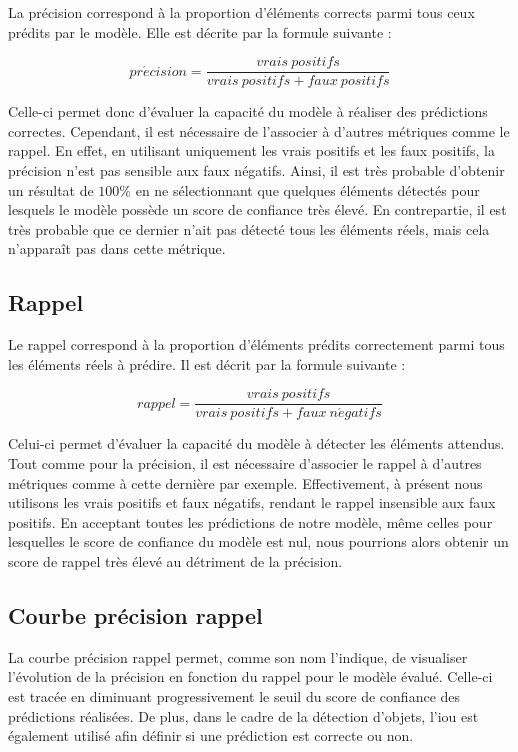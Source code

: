 La précision correspond à la proportion d'éléments corrects parmi tous ceux prédits par le modèle. Elle est décrite par la formule suivante :

\[pr\acute{e}cision = \frac{vrais \: positifs}{vrais \: positifs + faux \: positifs}\]

Celle-ci permet donc d'évaluer la capacité du modèle à réaliser des prédictions correctes. Cependant, il est nécessaire de l'associer à d'autres métriques comme le rappel. En effet, en utilisant uniquement les vrais positifs et les faux positifs, la précision n'est pas sensible aux faux négatifs. Ainsi, il est très probable d'obtenir un résultat de $100\%$ en ne sélectionnant que quelques éléments détectés pour lesquels le modèle possède un score de confiance très élevé. En contrepartie, il est très probable que ce dernier n'ait pas détecté tous les éléments réels, mais cela n'apparaît pas dans cette métrique.

\subsection{Rappel}

Le rappel correspond à la proportion d'éléments prédits correctement parmi tous les éléments réels à prédire. Il est décrit par la formule suivante :

\[rappel = \frac{vrais \: positifs}{vrais \: positifs + faux \: n\acute{e}gatifs}\]

Celui-ci permet d'évaluer la capacité du modèle à détecter les éléments attendus. Tout comme pour la précision, il est nécessaire d'associer le rappel à d'autres métriques comme à cette dernière par exemple. Effectivement, à présent nous utilisons les vrais positifs et faux négatifs, rendant le rappel insensible aux faux positifs. En acceptant toutes les prédictions de notre modèle, même celles pour lesquelles le score de confiance du modèle est nul, nous pourrions alors obtenir un score de rappel très élevé au détriment de la précision.

\subsection{Courbe précision rappel}

La courbe précision rappel permet, comme son nom l'indique, de visualiser l'évolution de la précision en fonction du rappel pour le modèle évalué. Celle-ci est tracée en diminuant progressivement le seuil du score de confiance des prédictions réalisées. De plus, dans le cadre de la détection d'objets, l'\acrshort{iou} est également utilisé afin définir si une prédiction est correcte ou non.\\

